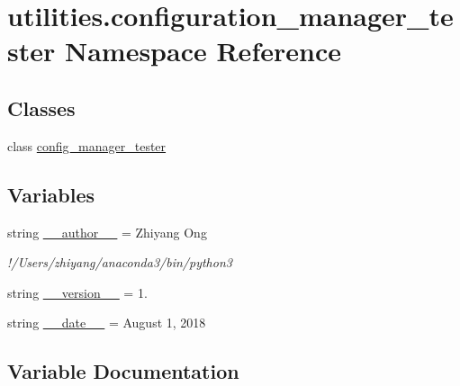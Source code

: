 \hypertarget{namespaceutilities_1_1configuration__manager__tester}{}\section{utilities.\+configuration\+\_\+manager\+\_\+tester Namespace Reference}
\label{namespaceutilities_1_1configuration__manager__tester}
\subsection*{Classes}
\begin{DoxyCompactItemize}
\item 
class \hyperlink{classutilities_1_1configuration__manager__tester_1_1config__manager__tester}{config\+\_\+manager\+\_\+tester}
\end{DoxyCompactItemize}
\subsection*{Variables}
\begin{DoxyCompactItemize}
\item 
string \hyperlink{namespaceutilities_1_1configuration__manager__tester_aa6fa7c3492580a61698b531deb1df918}{\+\_\+\+\_\+author\+\_\+\+\_\+} = \textquotesingle{}Zhiyang Ong\textquotesingle{}
\begin{DoxyCompactList}\small\item\em !/\+Users/zhiyang/anaconda3/bin/python3 \end{DoxyCompactList}\item 
string \hyperlink{namespaceutilities_1_1configuration__manager__tester_a5106d1471e1cb4d2b0f14486768f1096}{\+\_\+\+\_\+version\+\_\+\+\_\+} = \textquotesingle{}1.\textquotesingle{}
\item 
string \hyperlink{namespaceutilities_1_1configuration__manager__tester_ac13eba5bd97c2c6945d9195a63f2ee1b}{\+\_\+\+\_\+date\+\_\+\+\_\+} = \textquotesingle{}August 1, 2018\textquotesingle{}
\end{DoxyCompactItemize}


\subsection{Variable Documentation}
\hypertarget{namespaceutilities_1_1configuration__manager__tester_aa6fa7c3492580a61698b531deb1df918}{}
